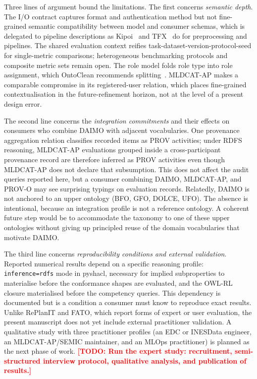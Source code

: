\documentclass[11pt,a4paper]{article}
\newcommand{\code}[1]{\texttt{#1}}
\newcommand{\TODO}[1]{\textcolor{red}{\textbf{[TODO: #1]}}}
\begin{document}
Three lines of argument bound the limitations. The first concerns \emph{semantic depth}. The I/O contract captures format and authentication method but not fine-grained semantic compatibility between model and consumer schemas, which is delegated to pipeline descriptions as Kipoi~\cite{kipoi} and TFX~\cite{tfx} do for preprocessing and pipelines. The shared evaluation context reifies task-dataset-version-protocol-seed for single-metric comparisons; heterogeneous benchmarking protocols and composite metric sets remain open. The role model folds role type into role assignment, which OntoClean recommends splitting~\cite{ontoclean}. MLDCAT-AP makes a comparable compromise in its registered-user relation, which places fine-grained contextualisation in the future-refinement horizon, not at the level of a present design error.

The second line concerns the \emph{integration commitments} and their effects on consumers who combine DAIMO with adjacent vocabularies. One provenance aggregation relation classifies recorded items as PROV activities; under RDFS reasoning, MLDCAT-AP evaluations grouped inside a cross-participant provenance record are therefore inferred as PROV activities even though MLDCAT-AP does not declare that subsumption. This does not affect the audit queries reported here, but a consumer combining DAIMO, MLDCAT-AP, and PROV-O may see surprising typings on evaluation records. Relatedly, DAIMO is not anchored to an upper ontology (BFO, GFO, DOLCE, UFO). The absence is intentional, because an integration profile is not a reference ontology. A coherent future step would be to accommodate the taxonomy to one of these upper ontologies without giving up principled reuse of the domain vocabularies that motivate DAIMO.

The third line concerns \emph{reproducibility conditions and external validation}. Reported numerical results depend on a specific reasoning profile: \code{inference=rdfs} mode in pyshacl, necessary for implied subproperties to materialise before the conformance shapes are evaluated, and the OWL-RL closure materialised before the competency queries. This dependency is documented but is a condition a consumer must know to reproduce exact results. Unlike RePlanIT and FATO, which report forms of expert or user evaluation, the present manuscript does not yet include external practitioner validation. A qualitative study with three practitioner profiles (an EDC or INESData engineer, an MLDCAT-AP/SEMIC maintainer, and an MLOps practitioner) is planned as the next phase of work. \TODO{Run the expert study: recruitment, semi-structured interview protocol, qualitative analysis, and publication of results.}
\end{document}
